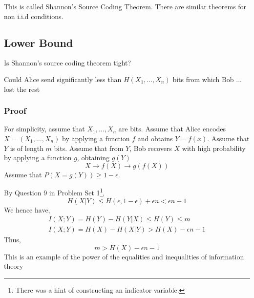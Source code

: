 \documentclass{article}
\begin{document}
This is called Shannon's Source Coding Theorem. There are similar theorems for non i.i.d conditions.

\subsection{Lower Bound}

Is Shannon's source coding theorem tight?

Could Alice send significantly less than $H\left(X_1,\ldots,X_n\right)$ bits from which Bob ... lost the rest

\subsubsection{Proof}

For simplicity, assume that $X_1,\ldots, X_n$ are bits. Assume that Alice encodes $X=\left(X_1,\ldots, X_n \right)$ by applying a function $f$ and obtains $Y=f(x)$. Assume that $Y$ is of length $m$ bits. Assume that from $Y$, Bob recovers $X$ with high probability by applying a function $g$, obtaining $g(Y)$
\[
X\to f(X)\to g(f(X))
\]
Assume that $P(X=g(Y))\geq 1-\epsilon$.

By Question 9 in Problem Set 1\footnote{There was a hint of constructing an indicator variable.},
\[
H(X|Y) \leq H(\epsilon, 1-\epsilon) + \epsilon n < \epsilon n + 1
\]
We hence have,
\begin{gather*}
    I(X;Y) = H(Y) - H(Y|X)\leq H(Y) \leq m \\
    I(X;Y) = H(X) - H(X|Y) > H(X) -\epsilon n - 1
\end{gather*}
Thus,
\[
m > H(X) -\epsilon n - 1
\]
This is an example of the power of the equalities and inequalities of information theory
\end{document}
